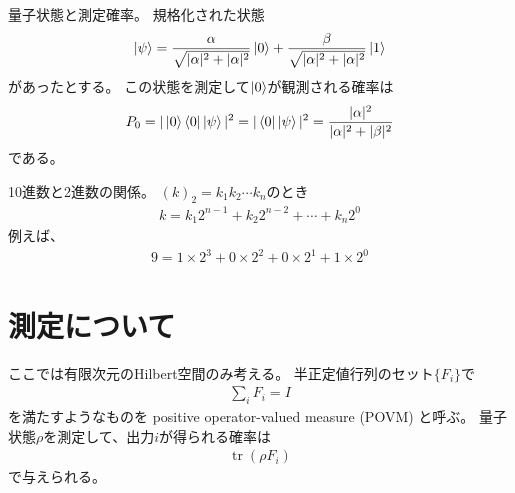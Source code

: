 \documentclass[]{ltjsarticle}
\DeclareMathOperator{\tr}{tr}
\begin{document}
量子状態と測定確率。
規格化された状態
\begin{align}
    \ket{\psi} 
    =
    \frac{\alpha}{\sqrt{|\alpha|^2+|\alpha|^2}} 
    \ket{0}   
    +
    \frac{\beta}{\sqrt{|\alpha|^2+|\alpha|^2}} 
    \ket{1}   
\end{align}
があったとする。
この状態を測定して$\ket{0}$が観測される確率は
\begin{align}
    P_0
    =
    |\ket{0}\bra{0}\ket{\psi}|^2
    =
    |\bra{0}\ket{\psi}|^2
    =
    \frac{|\alpha|^2}{|\alpha|^2 + |\beta|^2}
\end{align}
である。


10進数と2進数の関係。
$(k)_2 = k_1 k_2 \cdots k_n$のとき
\begin{align}
    k 
    = 
    k_1 2^{n-1}
    +
    k_2 2^{n-2}
    +
    \cdots
    +
    k_n 2^0
\end{align}
例えば、
\begin{align}
    9 
    = 
    1 \times 2^{3}
    +
    0 \times 2^{2}
    +
    0 \times 2^{1}
    +
    1 \times 2^0
\end{align}


\section{測定について}
ここでは有限次元のHilbert空間のみ考える。
半正定値行列のセット$\{F_i\}$で
\begin{align}
    \sum_i F_i = I
\end{align}
を満たすようなものを
positive operator-valued measure (POVM)
と呼ぶ。
量子状態$\rho$を測定して、出力$i$が得られる確率は
\begin{align}
    \tr(\rho F_i)    
\end{align}
で与えられる。
\end{document}

